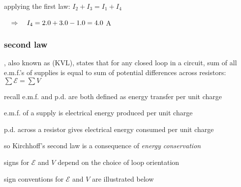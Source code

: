 
\sol applying the first law: $I_2 + I_3 = I_1 + I_4$
	
	\eqskip $\quad \Rightarrow \quad I_4 = 2.0 + 3.0 - 1.0 = 4.0$ A \eoe
	


\subsubsection{second law}

\begin{ilight}
	, also known as  (KVL), states that for any closed loop in a circuit, sum of all e.m.f.'s of supplies is equal to sum of potential differences across resistors: $\boxed{\sum \mathcal{E} = \sum V }$
\end{ilight}

\cmt recall e.m.f. and p.d. are both defined as energy transfer per unit charge

e.m.f. of a supply is electrical energy produced per unit charge

p.d. across a resistor gives electrical energy consumed per unit charge

so Kirchhoff's second law is a consequence of \emph{energy conservation}

\cmt signs for $\mathcal{E}$ and $V$ depend on the choice of loop orientation

sign conventions for $\mathcal{E}$ and $V$ are illustrated below

